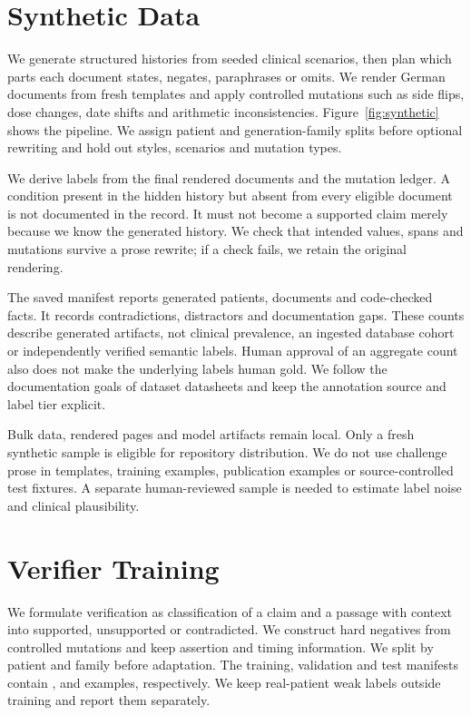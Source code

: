 \documentclass[10pt]{article}
\begin{document}
\FloatBarrier
\section{Synthetic Data}
We generate structured histories from seeded clinical scenarios, then plan which
parts each document states, negates, paraphrases or omits. We render German documents
from fresh templates and apply controlled mutations such as side flips, dose changes,
date shifts and arithmetic inconsistencies. Figure~\ref{fig:synthetic} shows the
pipeline. We assign patient and generation-family splits before optional rewriting
and hold out styles, scenarios and mutation types.


We derive labels from the final rendered documents and the mutation ledger. A
condition present in the hidden history but absent from every eligible document is
not documented in the record. It must not become a supported claim merely because
we know the generated history. We check that intended values, spans and mutations
survive a prose rewrite; if a check fails, we retain the original rendering.

The saved manifest reports \SynthPatients{} generated patients,
\SynthDocuments{} documents and \SynthFacts{} code-checked facts. It records
\SynthContradictions{} contradictions, \SynthDistractors{} distractors and
\SynthGaps{} documentation gaps. These counts describe generated artifacts, not
clinical prevalence, an ingested database cohort or independently verified semantic
labels. Human approval of an aggregate count also does not make the underlying
labels human gold. We follow the documentation goals of dataset datasheets
\citep{datasheets} and keep the annotation source and label tier explicit.

Bulk data, rendered pages and model artifacts remain local. Only a fresh synthetic
sample is eligible for repository distribution. We do not use challenge prose in
templates, training examples, publication examples or source-controlled test fixtures.
A separate human-reviewed sample is needed to estimate label noise and clinical
plausibility.

\FloatBarrier
\section{Verifier Training}
We formulate verification as classification of a claim and a passage with context
into supported, unsupported or contradicted. We construct hard negatives from
controlled mutations and keep assertion and timing information. We split by patient
and family before adaptation. The training, validation and test manifests contain
\TrainExamples{}, \ValidationExamples{} and \TestExamples{} examples, respectively.
We keep real-patient weak labels outside training and report them separately.
\end{document}
